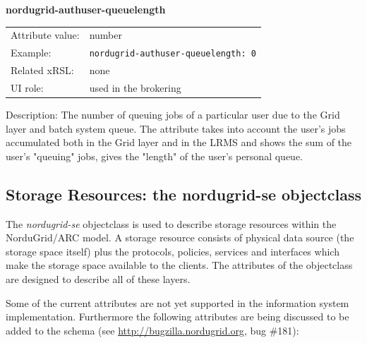 \documentclass{article}
\begin{document}
  \hspace*{0.5cm}
  \begin{shaded}
    \textbf{nordugrid-authuser-queuelength}
  \end{shaded}
  \begin{tabular}{lp{10cm}}  
    Attribute value:& number\\
    Example:& \verb#nordugrid-authuser-queuelength: 0#\\
    Related xRSL:& none\\
    UI role:& used in the brokering\\
  \end{tabular}

Description: The number of queuing jobs of a particular user due to the
Grid layer and batch system queue. The attribute takes into account the user's 
jobs accumulated both in the Grid layer and in the LRMS and shows the sum of the
user's "queuing" jobs, gives the "length" of the user's personal queue.


\subsection{Storage Resources: the nordugrid-se objectclass}

The {\it nordugrid-se} objectclass is used to describe storage resources 
within the NorduGrid/ARC model. A storage resource consists of physical data
source (the storage space itself) plus the protocols, policies,
services and interfaces which make the storage space available to the clients.
The attributes of the objectclass are designed to describe all of these layers.

Some of the current attributes are not yet supported in the information system
implementation. Furthermore the following attributes are being discussed
to be added to the schema (see \url{http://bugzilla.nordugrid.org}, bug \#181):
\end{document}
